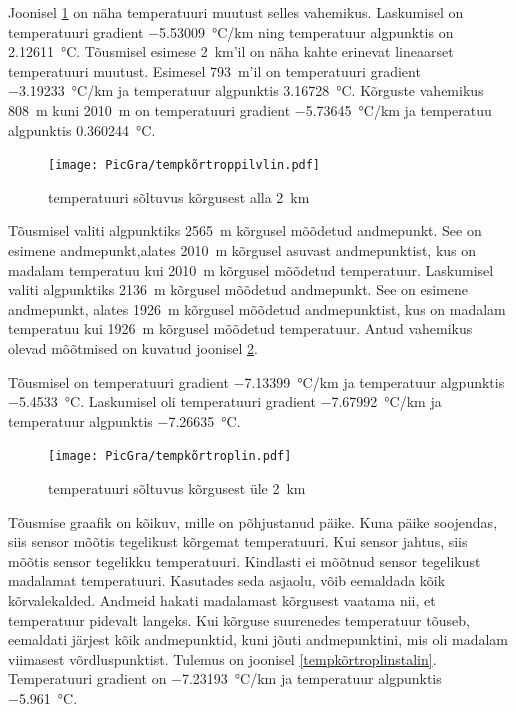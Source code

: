 \documentclass{trkut}%
\begin{document}
Joonisel \ref{tempkõrtroppilvlin} on näha temperatuuri muutust selles vahemikus. Laskumisel on temperatuuri gradient \SI{-5.53009}{\degreeCelsius/km} ning temperatuur algpunktis on \SI{2.12611}{\degreeCelsius}. Tõusmisel esimese \SI{2}{km}'il on näha kahte erinevat lineaarset temperatuuri muutust. Esimesel \SI{793}{m}'il on temperatuuri gradient \SI{-3.19233}{\degreeCelsius/km} ja temperatuur algpunktis \SI{3.16728}{\degreeCelsius}. Kõrguste vahemikus \SI{808}{m} kuni \SI{2010}{m} on temperatuuri gradient \SI{-5.73645}{\degreeCelsius/km} ja temperatuu algpunktis \SI{0.360244}{\degreeCelsius}.

\begin{figure}[h]
	\texttt{[image: PicGra/tempkõrtroppilvlin.pdf]}
	\caption{temperatuuri sõltuvus kõrgusest alla \SI{2}{km}}
	\label{tempkõrtroppilvlin}%
\end{figure}


Tõusmisel valiti algpunktiks \SI{2565}{m} kõrgusel mõõdetud andmepunkt. See on esimene andmepunkt,alates \SI{2010}{m} kõrgusel asuvast andmepunktist, kus on madalam temperatuu kui \SI{2010}{m} kõrgusel mõõdetud temperatuur. Laskumisel valiti algpunktiks \SI{2136}{m} kõrgusel mõõdetud andmepunkt. See on esimene andmepunkt, alates \SI{1926}{m} kõrgusel mõõdetud andmepunktist, kus on madalam temperatuu kui \SI{1926}{m} kõrgusel mõõdetud temperatuur. Antud vahemikus olevad mõõtmised on kuvatud joonisel \ref{tempkõrtroplin}.

Tõusmisel on temperatuuri gradient \SI{-7.13399}{\degreeCelsius/km} ja temperatuur algpunktis \SI{-5.4533}{\celsius}. Laskumisel oli temperatuuri gradient \SI{-7.67992}{\degreeCelsius/km} ja temperatuur algpunktis \SI{-7.26635}{\celsius}.

\begin{figure}[h]
	\texttt{[image: PicGra/tempkõrtroplin.pdf]}
	\caption{temperatuuri sõltuvus kõrgusest üle \SI{2}{km}}
	\label{tempkõrtroplin}%
\end{figure}

Tõusmise graafik on kõikuv, mille on põhjustanud päike. Kuna päike soojendas, siis sensor mõõtis tegelikust kõrgemat temperatuuri. Kui sensor jahtus, siis mõõtis sensor tegelikku temperatuuri. Kindlasti ei mõõtnud sensor tegelikust madalamat temperatuuri. Kasutades seda asjaolu, võib eemaldada kõik kõrvalekalded. Andmeid hakati madalamast kõrgusest vaatama nii, et temperatuur pidevalt langeks. Kui kõrguse suurenedes temperatuur tõuseb, eemaldati järjest kõik andmepunktid, kuni jõuti andmepunktini, mis oli madalam viimasest võrdluspunktist. Tulemus on joonisel \ref{tempkõrtroplinstalin}. Temperatuuri gradient on \SI{-7.23193}{\degreeCelsius/km} ja temperatuur algpunktis \SI{-5.961}{\celsius}.
\end{document}
